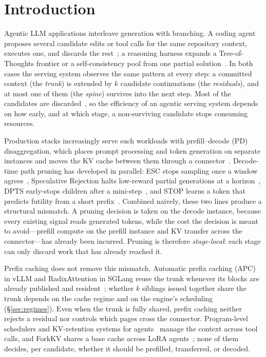 \section{Introduction}
\label{sec:intro}

Agentic LLM applications interleave generation with branching.
A coding agent proposes several candidate edits or tool calls for the same repository context, executes one, and discards the rest~\cite{react,sweagent,openhands}; a reasoning harness expands a Tree-of-Thoughts frontier or a self-consistency pool from one partial solution~\cite{tot,selfconsistency,cot}.
In both cases the serving system observes the same pattern at every step: a committed context (the \emph{trunk}) is extended by $k$ candidate continuations (the \emph{residuals}), and at most one of them (the \emph{spine}) survives into the next step.
Most of the candidates are discarded~\cite{gsm8k,math,esc}, so the efficiency of an agentic serving system depends on how early, and at which stage, a non-surviving candidate stops consuming resources.

Production stacks increasingly serve such workloads with prefill--decode (PD) disaggregation, which places prompt processing and token generation on separate instances and moves the KV cache between them through a connector~\cite{distserve,splitwise}.
Decode-time path pruning has developed in parallel: ESC stops sampling once a window agrees~\cite{esc}, Speculative Rejection halts low-reward partial generations at a horizon~\cite{specrej}, DPTS early-stops children after a mini-step~\cite{dpts}, and STOP learns a token that predicts futility from a short prefix~\cite{stoploss}.
Combined naively, these two lines produce a structural mismatch.
A pruning decision is taken on the decode instance, because every existing signal reads generated tokens, while the cost the decision is meant to avoid---prefill compute on the prefill instance and KV transfer across the connector---has already been incurred.
Pruning is therefore \emph{stage-local}: each stage can only discard work that has already reached it.

Prefix caching does not remove this mismatch.
Automatic prefix caching (APC) in vLLM and RadixAttention in SGLang reuse the trunk whenever its blocks are already published and resident~\cite{vllm,sglang}; whether $k$ siblings issued together share the trunk depends on the cache regime and on the engine's scheduling (\S\ref{sec:regimes}).
Even when the trunk is fully shared, prefix caching neither rejects a residual nor controls which pages cross the connector.
Program-level schedulers and KV-retention systems for agents~\cite{autellix,continuum,mori,conserve} manage the context across tool calls, and ForkKV shares a base cache across LoRA agents~\cite{forkkv}; none of them decides, per candidate, whether it should be prefilled, transferred, or decoded.

